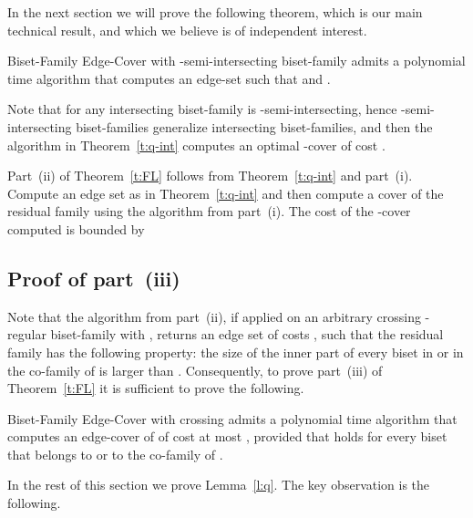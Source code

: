 In the next section we will prove the following theorem, which is our main technical result,
and which we believe is of independent interest.

\begin{theorem} \label{t:q-int}
{\sf Biset-Family Edge-Cover} with -semi-intersecting biset-family  admits a polynomial time algorithm 
that computes an edge-set  such that  
and . 
\end{theorem}

Note that for  any intersecting biset-family is -semi-intersecting, hence 
-semi-intersecting biset-families generalize intersecting biset-families, 
and then the algorithm in Theorem~\ref{t:q-int} computes an optimal -cover of cost .

Part~(ii) of Theorem~\ref{t:FL} follows from Theorem~\ref{t:q-int} and part~(i).
Compute an edge set  as in Theorem~\ref{t:q-int} and then compute 
a cover  of the residual family  using the algorithm from part~(i). 
The cost of the -cover  computed is bounded by


\subsection{Proof of part~(iii)}

Note that the algorithm from part~(ii), if applied on an arbitrary crossing -regular 
biset-family  with , 
returns an edge set  of costs ,
such that the residual family  has the following property: 
the size of the inner part of every biset
in  or in the co-family of  is larger than .
Consequently, to prove part~(iii) of Theorem~\ref{t:FL} it is sufficient to prove
the following.

\begin{lemma} \label{l:q}
{\sf Biset-Family Edge-Cover} with crossing 
admits a polynomial time algorithm that computes an edge-cover 
of  of cost at most 
,
provided that  holds
for every biset  that belongs to  or to the co-family of .
\end{lemma}

In the rest of this section we prove Lemma~\ref{l:q}. The key observation is the following.

